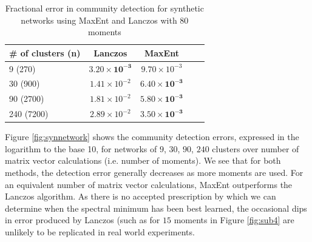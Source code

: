 \documentclass[letterpaper]{article} %
\begin{document}
\begin{table}[t]
	\caption{Fractional error in community detection for synthetic networks using MaxEnt and Lanczos with 80 moments}\label{table:fractional_error_syn}
	\begin{center}
		\begin{small}
			\begin{sc}
				\begin{tabular}{lcccr}
					\toprule
					\# of clusters (n) & Lanczos  & MaxEnt \\
					\midrule
					9 (270)    & $ \mathbf{3.20 \times 10^{-3}}$   & $9.70 \times 10^{-3}$  \\
					30 (900) & $ 1.41\times 10^{-2}$   & $ \mathbf{6.40 \times 10^{-3}}$ \\
					90 (2700) & $1.81\times 10^{-2}$   & $\mathbf{5.80\times 10^{-3}}$   \\
					240 (7200) & $2.89\times 10^{-2}$   & $\mathbf{3.50\times 10^{-3}}$   \\
					\bottomrule
				\end{tabular}
			\end{sc}
		\end{small}
	\end{center}
	\vskip -0.1in
\end{table}

Figure \ref{fig:synnetwork} shows the community detection errors, expressed in the logarithm to the base 10, for networks of $9$, $30$, $90$, $240$ clusters over number of matrix vector calculations (i.e. number of moments).  We see that for both methods, the detection error generally decreases as more moments are used. For an equivalent number of matrix vector calculations, MaxEnt outperforms the Lanczos algorithm. As there is no accepted prescription by which we can determine when the spectral minimum has been best learned, the occasional dips in error produced by Lanczos (such as for $15$ moments in Figure \ref{fig:sub4} are unlikely to be replicated in real world experiments. 
\end{document}
